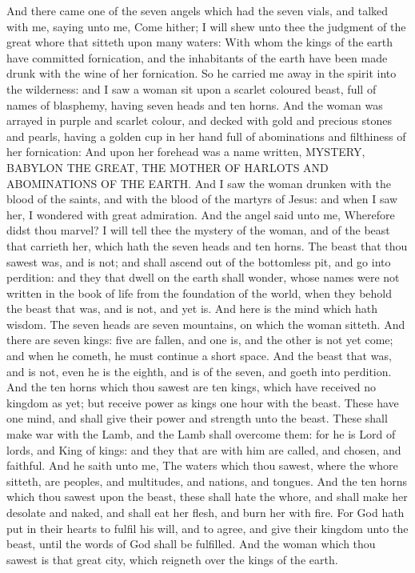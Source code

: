  And there came one of the seven angels which had the
seven vials, and talked with me, saying unto me, Come hither; I will
shew unto thee the judgment of the great whore that sitteth upon many
waters:  With whom the kings of the earth have committed
fornication, and the inhabitants of the earth have been made drunk with
the wine of her fornication.  So he carried me away in the
spirit into the wilderness: and I saw a woman sit upon a scarlet
coloured beast, full of names of blasphemy, having seven heads and ten
horns.  And the woman was arrayed in purple and scarlet
colour, and decked with gold and precious stones and pearls, having a
golden cup in her hand full of abominations and filthiness of her
fornication:  And upon her forehead was a name written,
MYSTERY, BABYLON THE GREAT, THE MOTHER OF HARLOTS AND ABOMINATIONS OF
THE EARTH.  And I saw the woman drunken with the blood of
the saints, and with the blood of the martyrs of Jesus: and when I saw
her, I wondered with great admiration.  And the angel said
unto me, Wherefore didst thou marvel? I will tell thee the mystery of
the woman, and of the beast that carrieth her, which hath the seven
heads and ten horns.  The beast that thou sawest was, and
is not; and shall ascend out of the bottomless pit, and go into
perdition: and they that dwell on the earth shall wonder, whose names
were not written in the book of life from the foundation of the world,
when they behold the beast that was, and is not, and yet is.
 And here is the mind which hath wisdom. The seven heads
are seven mountains, on which the woman sitteth.  And
there are seven kings: five are fallen, and one is, and the other is not
yet come; and when he cometh, he must continue a short space.
 And the beast that was, and is not, even he is the
eighth, and is of the seven, and goeth into perdition. 
And the ten horns which thou sawest are ten kings, which have received
no kingdom as yet; but receive power as kings one hour with the beast.
 These have one mind, and shall give their power and
strength unto the beast.  These shall make war with the
Lamb, and the Lamb shall overcome them: for he is Lord of lords, and
King of kings: and they that are with him are called, and chosen, and
faithful.  And he saith unto me, The waters which thou
sawest, where the whore sitteth, are peoples, and multitudes, and
nations, and tongues.  And the ten horns which thou
sawest upon the beast, these shall hate the whore, and shall make her
desolate and naked, and shall eat her flesh, and burn her with fire.
 For God hath put in their hearts to fulfil his will, and
to agree, and give their kingdom unto the beast, until the words of God
shall be fulfilled.  And the woman which thou sawest is
that great city, which reigneth over the kings of the earth.

